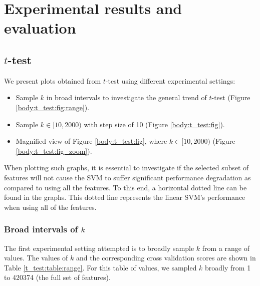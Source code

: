 \documentclass[12pt, twoside, a4paper]{report}
\begin{document}
\chapter{Experimental results and evaluation}
\label{evaluation}

\section{$t$-test}
We present plots obtained from $t$-test using different experimental settings:
\begin{itemize}
  \item Sample $k$ in broad intervals to investigate the general trend of $t$-test (Figure \ref{body:t_test:fig:range}).
  \item Sample $k\in [10,2000)$ with step size of 10 (Figure \ref{body:t_test:fig}).
  \item Magnified view of Figure \ref{body:t_test:fig}, where $k \in [10,2000)$ (Figure \ref{body:t_test:fig_zoom}).
\end{itemize}

When plotting such graphs, it is essential to investigate if the selected subset of features will not cause the SVM to suffer significant performance degradation as compared to using all the features. To this end, a horizontal dotted line can be found in the graphs. This dotted line represents the linear SVM's performance when using all of the features.

\subsection{Broad intervals of $k$}
The first experimental setting attempted is to broadly sample $k$ from a range of values. The values of $k$ and the corresponding cross validation scores are shown in Table \ref{t_test:table:range}. For this table of values, we sampled $k$ broadly from 1 to 420374 (the full set of features). 
\end{document}
